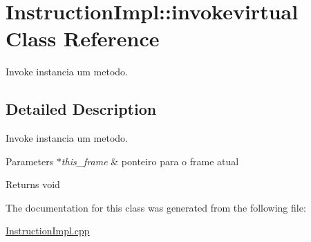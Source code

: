 \hypertarget{class_instruction_impl_1_1invokevirtual}{}\section{Instruction\+Impl\+:\+:invokevirtual Class Reference}
\label{class_instruction_impl_1_1invokevirtual}


Invoke instancia um metodo.  




\subsection{Detailed Description}
Invoke instancia um metodo. 


\begin{DoxyParams}{Parameters}
{\em $\ast$this\+\_\+frame} & ponteiro para o frame atual \\
\hline
\end{DoxyParams}
\begin{DoxyReturn}{Returns}
void 
\end{DoxyReturn}


The documentation for this class was generated from the following file\+:\begin{DoxyCompactItemize}
\item 
\hyperlink{_instruction_impl_8cpp}{Instruction\+Impl.\+cpp}\end{DoxyCompactItemize}
